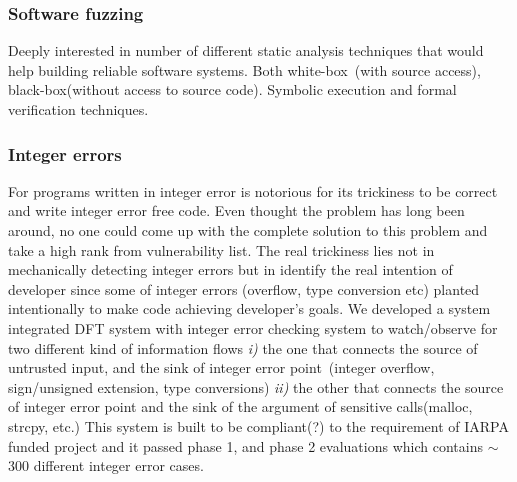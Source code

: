 \documentclass[letterpaper, 10pt]{article}
\begin{document}
\subsubsection*{Software fuzzing}

Deeply interested in number of different static analysis techniques that would
help building reliable software systems. Both white-box~(with source access),
black-box(without access to source code). Symbolic execution and formal
verification techniques.

\subsubsection*{Integer errors} 

For programs written in integer error is notorious for its trickiness to be
correct and write integer error free code. Even thought the problem has long
been around, no one could come up with the complete solution to this problem
and take a high rank from vulnerability list. 
%
The real trickiness lies not in mechanically detecting integer errors but in
identify the real intention of developer since some of integer errors
(overflow, type conversion etc) planted intentionally to make code achieving
developer's goals.
%
We developed a system integrated DFT system with integer error checking system
to watch/observe for two different kind of information flows {\it i)} the one
that connects the source of untrusted input, and the sink of integer error
point~(integer overflow, sign/unsigned extension, type conversions) {\it ii)}
the other that connects the source of integer error point and the sink of the
argument of sensitive calls(malloc, strcpy, etc.)
% 
This system is built to be compliant(?) to the requirement of IARPA funded
project and it passed phase 1, and phase 2 evaluations which contains $\sim$
300 different integer error cases.

\newpage



\end{document}
